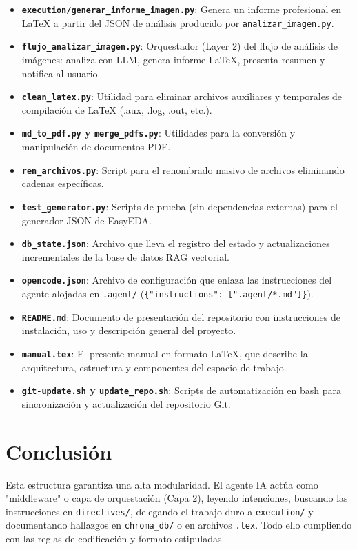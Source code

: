 \documentclass[12pt,a4paper]{article}
\begin{document}
\begin{itemize}
    \item \textbf{\texttt{execution/generar\_informe\_imagen.py}}: Genera un informe profesional en LaTeX a partir del JSON de análisis producido por \texttt{analizar\_imagen.py}.
    \item \textbf{\texttt{flujo\_analizar\_imagen.py}}: Orquestador (Layer 2) del flujo de análisis de imágenes: analiza con LLM, genera informe LaTeX, presenta resumen y notifica al usuario.
    \item \textbf{\texttt{clean\_latex.py}}: Utilidad para eliminar archivos auxiliares y temporales de compilación de LaTeX (.aux, .log, .out, etc.).
    \item \textbf{\texttt{md\_to\_pdf.py} y \texttt{merge\_pdfs.py}}: Utilidades para la conversión y manipulación de documentos PDF.
    \item \textbf{\texttt{ren\_archivos.py}}: Script para el renombrado masivo de archivos eliminando cadenas específicas.
    \item \textbf{\texttt{test\_generator.py}}: Scripts de prueba (sin dependencias externas) para el generador JSON de EasyEDA.
    \item \textbf{\texttt{db\_state.json}}: Archivo que lleva el registro del estado y actualizaciones incrementales de la base de datos RAG vectorial.
    \item \textbf{\texttt{opencode.json}}: Archivo de configuración que enlaza las instrucciones del agente alojadas en \texttt{.agent/} (\texttt{\{"instructions": [".agent/*.md"]\}}).
    \item \textbf{\texttt{README.md}}: Documento de presentación del repositorio con instrucciones de instalación, uso y descripción general del proyecto.
    \item \textbf{\texttt{manual.tex}}: El presente manual en formato LaTeX, que describe la arquitectura, estructura y componentes del espacio de trabajo.
    \item \textbf{\texttt{git-update.sh} y \texttt{update\_repo.sh}}: Scripts de automatización en bash para sincronización y actualización del repositorio Git.
\end{itemize}

\section{Conclusión}
Esta estructura garantiza una alta modularidad. El agente IA actúa como "middleware" o capa de orquestación (Capa 2), leyendo intenciones, buscando las instrucciones en \texttt{directives/}, delegando el trabajo duro a \texttt{execution/} y documentando hallazgos en \texttt{chroma\_db/} o en archivos \texttt{.tex}. Todo ello cumpliendo con las reglas de codificación y formato estipuladas.
\end{document}
